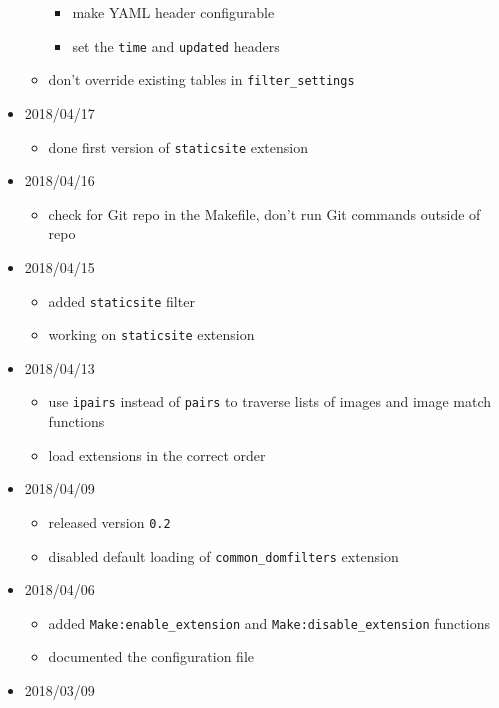 \begin{itemize}
\begin{itemize}
    \begin{itemize}
    \tightlist
    \item
      make YAML header configurable
    \item
      set the \texttt{time} and \texttt{updated} headers
    \end{itemize}
  \item
    don't override existing tables in \texttt{filter\_settings}
  \end{itemize}
\item
  2018/04/17

  \begin{itemize}
  \tightlist
  \item
    done first version of \texttt{staticsite} extension
  \end{itemize}
\item
  2018/04/16

  \begin{itemize}
  \tightlist
  \item
    check for Git repo in the Makefile, don't run Git commands outside
    of repo
  \end{itemize}
\item
  2018/04/15

  \begin{itemize}
  \tightlist
  \item
    added \texttt{staticsite} filter
  \item
    working on \texttt{staticsite} extension
  \end{itemize}
\item
  2018/04/13

  \begin{itemize}
  \tightlist
  \item
    use \texttt{ipairs} instead of \texttt{pairs} to traverse lists of
    images and image match functions
  \item
    load extensions in the correct order
  \end{itemize}
\item
  2018/04/09

  \begin{itemize}
  \tightlist
  \item
    released version \texttt{0.2}
  \item
    disabled default loading of \texttt{common\_domfilters} extension
  \end{itemize}
\item
  2018/04/06

  \begin{itemize}
  \tightlist
  \item
    added \texttt{Make:enable\_extension} and
    \texttt{Make:disable\_extension} functions
  \item
    documented the configuration file
  \end{itemize}
\item
  2018/03/09


\end{itemize}
